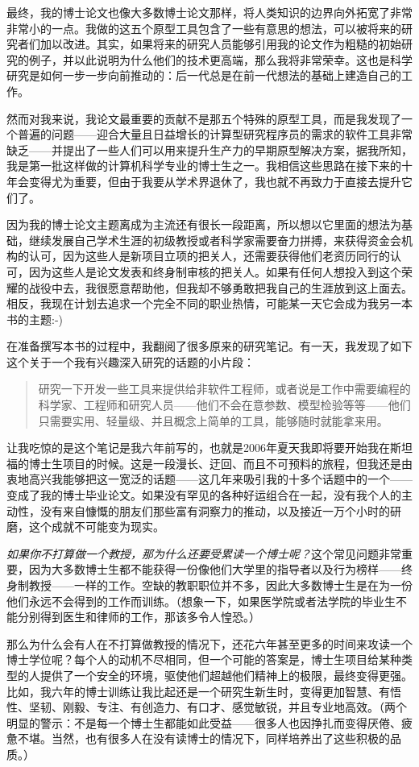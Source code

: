 \documentclass[letter,12pt]{book}
\begin{document}
\begin{CJK}{UTF8}{gbsn}
最终，我的博士论文也像大多数博士论文那样，将人类知识的边界向外拓宽了非常非常小的一点。我做的这五个原型工具包含了一些有意思的想法，可以被将来的研究者们加以改进。其实，如果将来的研究人员能够引用我的论文作为粗糙的初始研究的例子，并以此说明为什么他们的技术更高端，那么我将非常荣幸。这也是科学研究是如何一步一步向前推动的：后一代总是在前一代想法的基础上建造自己的工作。

然而对我来说，我论文最重要的贡献不是那五个特殊的原型工具，而是我发现了一个普遍的问题——迎合大量且日益增长的计算型研究程序员的需求的软件工具非常缺乏——并提出了一些人们可以用来提升生产力的早期原型解决方案，据我所知，我是第一批这样做的计算机科学专业的博士生之一。我相信这些思路在接下来的十年会变得尤为重要，但由于我要从学术界退休了，我也就不再致力于直接去提升它们了。

因为我的博士论文主题离成为主流还有很长一段距离，所以想以它里面的想法为基础，继续发展自己学术生涯的初级教授或者科学家需要奋力拼搏，来获得资金会机构的认可，因为这些人是新项目立项的把关人，还需要获得他们老资历同行的认可，因为这些人是论文发表和终身制审核的把关人。如果有任何人想投入到这个荣耀的战役中去，我很愿意帮助他，但我却不够勇敢把我自己的生涯放到这上面去。相反，我现在计划去追求一个完全不同的职业热情，可能某一天它会成为我另一本书的主题:-)

\breakline

在准备撰写本书的过程中，我翻阅了很多原来的研究笔记。有一天，我发现了如下这个关于一个我有兴趣深入研究的话题的小片段：
\begin{quote}
  研究一下开发一些工具来提供给非软件工程师，或者说是工作中需要编程的科学家、工程师和研究人员——他们不会在意参数、模型检验等等——他们只需要实用、轻量级、并且概念上简单的工具，能够随时就能拿来用。
\end{quote}
让我吃惊的是这个笔记是我六年前写的，也就是2006年夏天我即将要开始我在斯坦福的博士生项目的时候。这是一段漫长、迂回、而且不可预料的旅程，但我还是由衷地高兴我能够把这一宽泛的话题——这几年来吸引我的十多个话题中的一个——变成了我的博士毕业论文。如果没有罕见的各种好运组合在一起，没有我个人的主动性，没有来自慷慨的朋友们那些富有洞察力的推动，以及接近一万个小时的研磨，这个成就不可能变为现实。

\emph{如果你不打算做一个教授，那为什么还要受累读一个博士呢？}这个常见问题非常重要，因为大多数博士生都不能获得一份像他们大学里的指导者以及行为榜样——终身制教授——一样的工作。空缺的教职职位并不多，因此大多数博士生是在为一份他们永远不会得到的工作而训练。（想象一下，如果医学院或者法学院的毕业生不能分别得到医生和律师的工作，那该多令人惶恐。）

那么为什么会有人在不打算做教授的情况下，还花六年甚至更多的时间来攻读一个博士学位呢？每个人的动机不尽相同，但一个可能的答案是，博士生项目给某种类型的人提供了一个安全的环境，驱使他们超越他们精神上的极限，最终变得更强。比如，我六年的博士训练让我比起还是一个研究生新生时，变得更加智慧、有悟性、坚韧、刚毅、专注、有创造力、有口才、感觉敏锐，并且专业地高效。（两个明显的警示：不是每一个博士生都能如此受益——很多人也因挣扎而变得厌倦、疲惫不堪。当然，也有很多人在没有读博士的情况下，同样培养出了这些积极的品质。）


\end{CJK}
\end{document}
